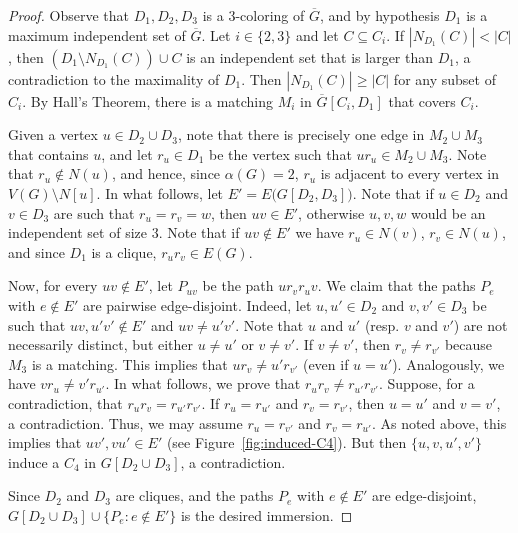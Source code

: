 \documentclass[a4paper,12pt]{article}
\newcommand{\Gcompl}{\overline{G}}
\begin{document}
\begin{proof}
	Observe that \(D_1,D_2,D_3\) is a \(3\)-coloring of \(\Gcompl\),
	and by hypothesis \(D_1\) is a maximum independent set of \(\Gcompl\).
	Let \(i\in\{2,3\}\) and let \(C\subseteq C_i\).
	If \(|N_{D_1}(C)| < |C|\), 
	then \((D_1\setminus N_{D_1}(C))\cup C\) is an independent set that is larger than \(D_1\),
	a contradiction to the maximality of \(D_1\).
	Then \(|N_{D_1}(C)| \geq |C|\) for any subset of \(C_i\).
	By Hall's Theorem, there is a matching \(M_i\) in \(\Gcompl[C_i,D_1]\) that covers \(C_i\).
	
	Given a vertex \(u\in D_2 \cup D_3\), 
	note that there is precisely one edge in \(M_2\cup M_3\) that contains \(u\),
	and let \(r_u\in D_1\) be the vertex such that \(ur_u\in M_2\cup M_3\).
	Note that \(r_u \notin N(u)\),
	and hence, since \(\alpha(G) = 2\), \(r_u\) is adjacent to every vertex in \(V(G)\setminus N[u]\).
	In what follows, let \(E' = E\big(G[D_2,D_3]\big)\).
	Note that if \(u\in D_2\) and \(v\in D_3\) are such that \(r_u = r_v = w\),
	then \(uv \in E'\), otherwise \(u,v,w\) would be an independent set of size \(3\).
%	
	Note that if \(uv\notin E'\) we have \(r_u\in N(v)\), \(r_v\in N(u)\),
	and since \(D_1\) is a clique, \(r_ur_v\in E(G)\).

	Now, for every \(uv\notin E'\), let \(P_{uv}\) be the path \(u r_v r_u v\).
	We claim that the paths \(P_e\) with \(e\notin E'\) are pairwise edge-disjoint.
	Indeed, let \(u,u' \in D_2\) and \(v,v' \in D_3\) be such that \(uv,u'v' \notin E'\)
	and \(uv \neq u'v'\).
	Note that \(u\) and \(u'\) (resp. \(v\) and \(v'\)) are not necessarily distinct,
	but either \(u \neq u'\) or \(v \neq v'\).
	If \(v\neq v'\), then \(r_v \neq r_{v'}\) because \(M_3\) is a matching.
	This implies that \(ur_v \neq u'r_{v'}\) (even if \(u = u'\)).
	Analogously, we have \(vr_u \neq v'r_{u'}\).
	In what follows, we prove that \(r_ur_v \neq r_{u'}r_{v'}\).
	Suppose, for a contradiction, that \(r_ur_v = r_{u'}r_{v'}\).
	If \(r_u = r_{u'}\) and \(r_v = r_{v'}\), then \(u=u'\) and \(v=v'\), a contradiction.
	Thus, we may assume \(r_u = r_{v'}\) and \(r_v = r_{u'}\).
	As noted above, this implies that \(uv',vu' \in E'\) (see Figure~\ref{fig:induced-C4}).
	But then \(\{u,v,u',v'\}\) induce a \(C_4\) in \(G[D_2\cup D_3]\),
	a contradiction.
	
	Since \(D_2\) and \(D_3\) are cliques,
	and the paths \(P_e\) with \(e\notin E'\) are edge-disjoint,
	\(G[D_2\cup D_3]\cup\{P_e : e\notin E'\}\) is the desired immersion.
\end{proof}
\end{document}
